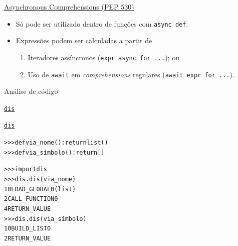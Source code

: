 \documentclass[11pt]{beamer}
\begin{document}
\begin{frame}[fragile]{\href{https://www.python.org/dev/peps/pep-0530/}{Asynchronous Comprehensions (PEP 530)}}
  \begin{itemize}
    \item Só pode ser utilizado dentro de funções com \texttt{async def}.
    \item Expressões podem ser calculadas a partir de
    \begin{enumerate}[i]
      \item Iteradores assíncronos (\texttt{expr async for ...}); ou
      \item Uso de \texttt{await} em \emph{comprehensions} regulares (\texttt{await expr for ...}).
    \end{enumerate}
  \end{itemize}
\end{frame}


\begin{frame}[standout]
  Análise de código
\end{frame}

\begin{frame}[fragile]{\href{https://docs.python.org/3/library/dis.html}{\texttt{dis}}}
   \hspace*{-.5cm}
\end{frame}

\begin{frame}[fragile]{\href{https://docs.python.org/3/library/dis.html}{\texttt{dis}}}
\begin{alltt}\small
>>> def via_nome(): return list()
>>> def via_símbolo(): return []

>>> import dis
>>> dis.dis(via_nome)
  1           0 LOAD_GLOBAL              0 (list)
              2 CALL_FUNCTION            0
              4 RETURN_VALUE
>>> dis.dis(via_símbolo)
  1           0 BUILD_LIST               0
              2 RETURN_VALUE
\end{alltt}
\end{frame}
\end{document}
